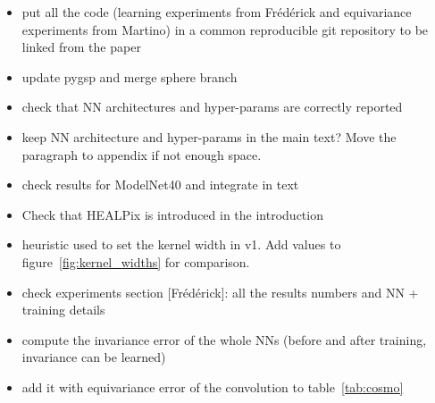 \documentclass{article} %
\newcommand{\figref}[1]{figure~\ref{fig:#1}}
\newcommand{\tabref}[1]{table~\ref{tab:#1}}
\begin{document}
{\begin{itemize}
	\item put all the code (learning experiments from Frédérick and equivariance experiments from Martino) in a common reproducible git repository to be linked from the paper
	\item update pygsp and merge sphere branch
	\item check that NN architectures and hyper-params are correctly reported
	\item keep NN architecture and hyper-params in the main text? Move the paragraph to appendix if not enough space.
	\item check results for ModelNet40 and integrate in text
	\item Check that HEALPix is introduced in the introduction
	\item heuristic used to set the kernel width in v1. Add values to \figref{kernel_widths} for comparison.
	\item check experiments section [Frédérick]: all the results numbers and NN + training details
	\item compute the invariance error of the whole NNs (before and after training, invariance can be learned)
	\item add it with equivariance error of the convolution to \tabref{cosmo}
\end{itemize}
}
\newpage

\maketitle
\end{document}

